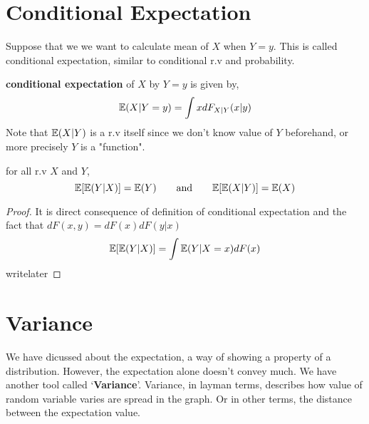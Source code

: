 \section{Conditional Expectation}
Suppose that we we want to calculate mean of $X$ when $Y=y$. This is called conditional expectation, similar to conditional r.v and probability.
\begin{definition} \textbf{conditional expectation} of $X$ by $Y=y$ is given by,
\[{\mathbb{E}}(X | Y=y) = \int x dF_{X|Y}(x|y)\]
Note that ${\mathbb{E}}(X|Y)$ is a r.v itself since we don't know value of $Y$ beforehand, or more precisely $Y$ is a "function".
\end{definition}
\begin{theorem} for all r.v $X$ and $Y$,
    \[{\mathbb{E}}[{\mathbb{E}}(Y|X)] = {\mathbb{E}}(Y) \qquad \text{and} \qquad  {\mathbb{E}}[{\mathbb{E}}(X|Y)] = {\mathbb{E}}(X)\]
    \begin{proof}
        It is direct consequence of definition of conditional expectation and the fact that $dF(x,y) = dF(x)dF(y|x)$
        \[ {\mathbb{E}}[{\mathbb{E}}(Y|X)] = \int {\mathbb{E}}(Y|X=x) dF(x)\]writelater
    \end{proof}
\end{theorem}
\section{Variance}
We have dicussed about the expectation, a way of showing a property of a distribution. However, the expectation alone doesn't convey much. We have another tool called `\textbf{Variance}'.
Variance, in layman terms, describes how value of random variable varies are spread in the graph. Or in other terms, the distance between the expectation value. 
\par

